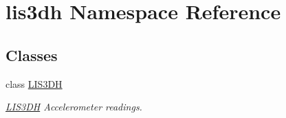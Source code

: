\hypertarget{namespacelis3dh}{}\section{lis3dh Namespace Reference}
\label{namespacelis3dh}
\subsection*{Classes}
\begin{DoxyCompactItemize}
\item 
class \mbox{\hyperlink{classlis3dh_1_1_l_i_s3_d_h}{L\+I\+S3\+DH}}
\begin{DoxyCompactList}\small\item\em \mbox{\hyperlink{classlis3dh_1_1_l_i_s3_d_h}{L\+I\+S3\+DH}} Accelerometer readings. \end{DoxyCompactList}\end{DoxyCompactItemize}
